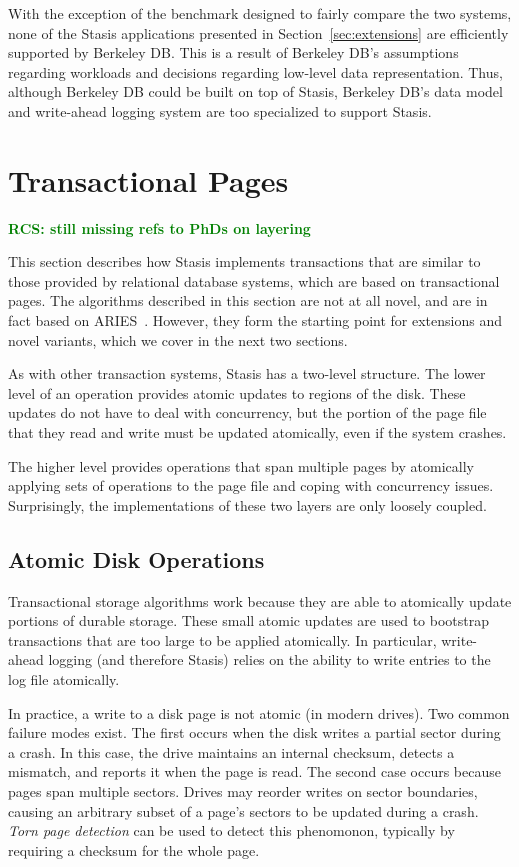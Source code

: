 \documentclass[letterpaper,twocolumn,10pt]{article}
\newcommand{\yad}{Stasis\xspace}
\newcommand{\rcs}[1]{\textcolor{green}{\bf RCS: #1}}
\begin{document}
With the exception of the benchmark designed to fairly compare the two
systems, none of the \yad applications presented in
Section~\ref{sec:extensions} are efficiently supported by Berkeley DB.
This is a result of Berkeley DB's assumptions regarding workloads and
decisions regarding low-level data representation.  Thus, although
Berkeley DB could be built on top of \yad, Berkeley DB's data model
and write-ahead logging system are too specialized to support \yad.




\section{Transactional Pages}

\rcs{still missing refs to PhDs on layering}

This section describes how \yad implements transactions that are
similar to those provided by relational database systems, which are
based on transactional pages.  The algorithms described in this
section are not at all novel, and are in fact based on
ARIES~\cite{aries}.  However, they form the starting point for
extensions and novel variants, which we cover in the next two
sections.

As with other transaction systems, \yad has a two-level structure.
The lower level of an operation provides atomic
updates to regions of the disk.  These updates do not have to deal
with concurrency, but the portion of the page file that they read and
write must be updated atomically, even if the system crashes.

The higher level provides operations that span multiple pages by
atomically applying sets of operations to the page file and coping
with concurrency issues.  Surprisingly, the implementations of these
two layers are only loosely coupled.


\subsection{Atomic Disk Operations}

Transactional storage algorithms work because they are able to
atomically update portions of durable storage.  These small atomic
updates are used to bootstrap transactions that are too large to be
applied atomically.  In particular, write-ahead logging (and therefore
\yad) relies on the ability to write entries to the log
file atomically.

In practice, a write to a disk page is not atomic (in modern drives).  Two common failure
modes exist.  The first occurs when the disk writes a partial sector
during a crash.  In this case, the drive maintains an internal
checksum, detects a mismatch, and reports it when the page is read.
The second case occurs because pages span multiple sectors.  Drives
may reorder writes on sector boundaries, causing an arbitrary subset
of a page's sectors to be updated during a crash.  {\em Torn page
detection} can be used to detect this phenomonon, typically by
requiring a checksum for the whole page. 
\end{document}
